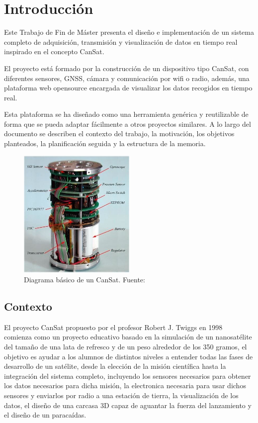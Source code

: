 \chapter{Introducción}

\label{cap:introduccion}
Este Trabajo de Fin de Máster presenta el diseño e implementación de un sistema completo de adquisición, transmisión y visualización de datos en tiempo real inspirado en el concepto CanSat.

El proyecto está formado por la construcción de un dispositivo tipo CanSat, con diferentes sensores, GNSS, cámara y comunicación por wifi o radio,
además, una plataforma web opensource encargada de visualizar los datos recogidos en tiempo real.

Esta plataforma se ha diseñado como una herramienta genérica y reutilizable de forma que se pueda adaptar fácilmente a otros proyectos similares.
A lo largo del documento se describen el contexto del trabajo, la motivación, los objetivos planteados, la planificación seguida y la estructura de la memoria.

\begin{figure}
    \centering
    \includegraphics[width=0.5\textwidth]{Imagenes/Bitmap/cansat}
    \caption{Diagrama básico de un CanSat. Fuente: \cite{researchgate_cansat2018}}
    \label{fig:cansat}
\end{figure}


\section{Contexto}
El proyecto CanSat propuesto por el profesor Robert J. Twiggs en 1998~\cite{jaxa_cansat} comienza como un proyecto educativo basado en la simulación de un nanosatélite del tamaño de una lata de refresco y de un peso alrededor de los 350 gramos,
el objetivo es ayudar a los alumnos de distintos niveles a entender todas las fases de desarrollo de un satélite, desde la elección de la misión científica hasta la integración del sistema completo,
incluyendo los sensores necesarios para obtener los datos necesarios para dicha misión, la electronica necesaria para usar dichos sensores y enviarlos por radio a una estación de tierra,
la visualización de los datos, el diseño de una carcasa 3D capaz de aguantar la fuerza del lanzamiento y el diseño de un paracaídas.

